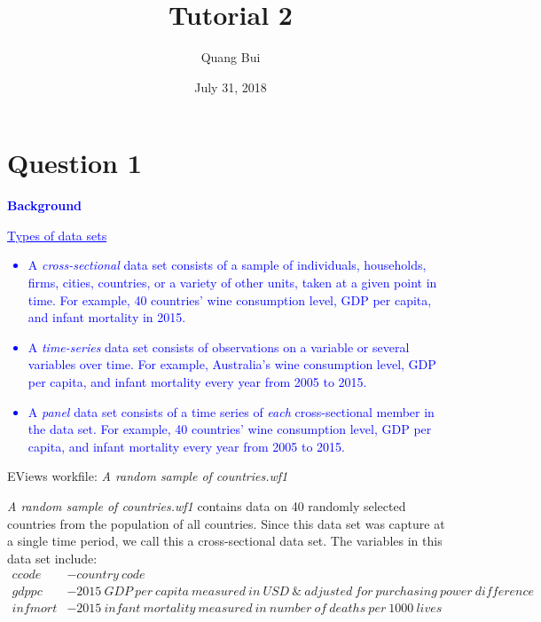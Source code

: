 \documentclass[12pt]{report}
\title{Tutorial 2}
\author{Quang Bui}
\subtitle
{
	\textbf{keywords}: cross sectional data, time series data, histogram, summary statistics, scatter plot, confidence interval of population mean, logarithmic transformation, trends, seasonality
	
	\textbf{estimated reading time}: 34 minutes
}
\date{July 31, 2018}
\newenvironment{blueframed}[1][blue]
{\def\FrameCommand{\fboxsep=\FrameSep\fcolorbox{#1}{white}}%
\MakeFramed {\advance\hsize-\width \FrameRestore}}
{\endMakeFramed}
\begin{document}
	
\maketitle

\section*{Question 1}

\justify
\begin{blueframed}
	\textcolor{blue}{\textbf{Background}}
	\vspace{-\baselineskip}
	\justify
	\textcolor{blue}{\underline{Types of data sets} \begin{itemize}
			\item A \textit{cross-sectional} data set consists of a sample of individuals, households, firms, cities, countries, or a variety of other units, taken at a given point in time. For example, 40 countries' wine consumption level, GDP per capita, and infant mortality in 2015.
			\item A \textit{time-series} data set consists of observations on a variable or several variables over time. For example, Australia's wine consumption level, GDP per capita, and infant mortality every year from 2005 to 2015.
			\item A \textit{panel} data set consists of a time series of \textit{each} cross-sectional member in the data set. For example, 40 countries' wine consumption level, GDP per capita, and infant mortality every year from 2005 to 2015.
	\end{itemize}}
\end{blueframed}

\noindent EViews workfile: \textit{A random sample of countries.wf1}

\noindent \textit{A random sample of countries.wf1} contains data on 40 randomly selected countries from the population of all countries. Since this data set was capture at a single time period, we call this a cross-sectional data set. The variables in this data set include:
\begin{align*}
ccode &- country\ code \\
gdppc &- 2015\ GDP\ per\ capita\ measured\ in\ USD\ \&\ adjusted\ for\ purchasing\ power\ difference \\
infmort &- 2015\ infant\ mortality\ measured\ in\ number\ of\ deaths\ per\ 1000\ lives 
\end{align*}
\end{document}
